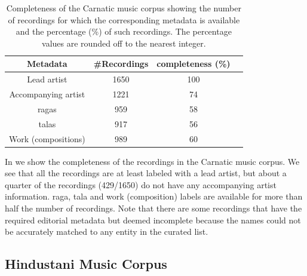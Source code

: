 \begin{table}
	\begin{centering}
		\begin{tabular}{ c c c c}
			\hline
			Metadata	 		&  \#Recordings	& completeness (\%)\\
			\hline
			Lead artist			& 	1650	& 	100	\\						
			Accompanying artist	& 	1221	& 	74	\\
			\Glspl{raga}		& 	959		& 	58	\\
			\Glspl{tala}		& 	917		& 	56	\\
			Work (compositions)		& 	989		& 	60	\\
			
			\hline
			
		\end{tabular}
		\par \end{centering}	
	\caption[Completeness of the Carnatic music corpus]{Completeness of the Carnatic music corpus showing the number of recordings for which the corresponding metadata is available and the percentage (\%) of such recordings. The percentage values are rounded off to the nearest integer.} 
	\label{tab:completeness_carnatic_corpus}
\end{table}


In  we show the completeness of the recordings in the Carnatic music corpus. We see that all the recordings are at least labeled with a lead artist, but about a quarter of the recordings (429/1650) do not have any accompanying artist information. \Gls{raga}, \gls{tala} and work (composition) labels are available for more than half the number of recordings. Note that there are some recordings that have the required editorial metadata but deemed incomplete because the names could not be accurately matched to any entity in the curated list. 


\subsection{Hindustani Music Corpus}
\label{sec:corpus_hindustani_music_corpus}

